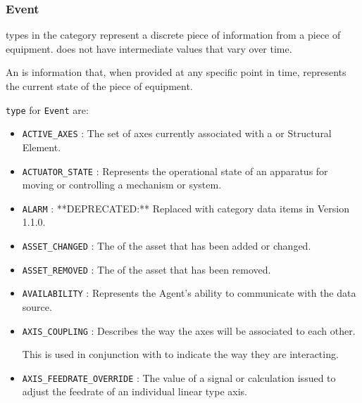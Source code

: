 \FloatBarrier

\subsubsection{Event}
  \label{sec:Event}


 types in the  category represent a discrete piece of information from a piece of equipment.   does not have intermediate values that vary over time.

An  is information that, when provided at any specific point in time, represents the current state of the piece of equipment.


 \texttt{type} for \texttt{Event} are:
\begin{itemize}

\item \texttt{ACTIVE_AXES} : The set of axes currently associated with a  or  \gls{Structural Element}. 

\item \texttt{ACTUATOR_STATE} : Represents the operational state of an apparatus for moving or controlling a mechanism or system. 

\item \texttt{ALARM} : **DEPRECATED:** Replaced with  category data items in Version 1.1.0. 

\item \texttt{ASSET_CHANGED} : The  of the asset that has been added or changed. 

\item \texttt{ASSET_REMOVED} : The  of the asset that has been removed. 

\item \texttt{AVAILABILITY} : Represents the \gls{Agent}'s ability to communicate with the data source. 

\item \texttt{AXIS_COUPLING} : Describes the way the axes will be associated to each other. 
  
This is used in conjunction with  to indicate the way they are interacting. 

\item \texttt{AXIS_FEEDRATE_OVERRIDE} : The value of a signal or calculation issued to adjust the feedrate of an individual linear type axis. 


\end{itemize}
